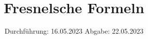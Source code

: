 

\subject{V407}
\title{Fresnelsche Formeln}
\date{%
  Durchführung: 16.05.2023
  \hspace{3em}
  Abgabe: 22.05.2023
}



\maketitle
\thispagestyle{empty}
\tableofcontents
\newpage
\setcounter{page}{1}





\printbibliography{}


